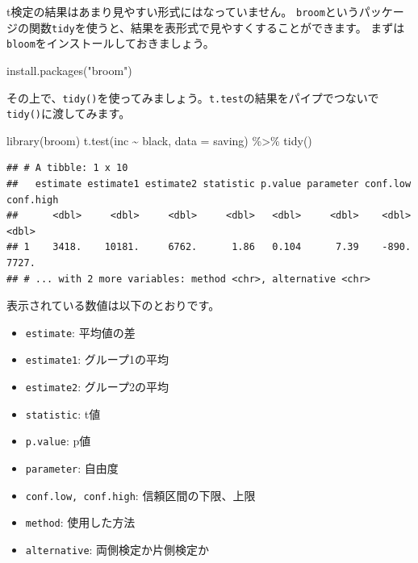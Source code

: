 \documentclass[
]{book}
\newenvironment{Shaded}{\begin{snugshade}}{\end{snugshade}}
\newcommand{\AttributeTok}[1]{\textcolor[rgb]{0.77,0.63,0.00}{#1}}
\newcommand{\FunctionTok}[1]{\textcolor[rgb]{0.00,0.00,0.00}{#1}}
\newcommand{\NormalTok}[1]{#1}
\newcommand{\SpecialCharTok}[1]{\textcolor[rgb]{0.00,0.00,0.00}{#1}}
\newcommand{\StringTok}[1]{\textcolor[rgb]{0.31,0.60,0.02}{#1}}
\providecommand{\tightlist}{%
  \setlength{\itemsep}{0pt}\setlength{\parskip}{0pt}}
\begin{document}
t検定の結果はあまり見やすい形式にはなっていません。
\texttt{broom}というパッケージの関数\texttt{tidy}を使うと、結果を表形式で見やすくすることができます。
まずは\texttt{bloom}をインストールしておきましょう。

\begin{Shaded}
\begin{Highlighting}[]
\FunctionTok{install.packages}\NormalTok{(}\StringTok{"broom"}\NormalTok{)}
\end{Highlighting}
\end{Shaded}

その上で、\texttt{tidy()}を使ってみましょう。\texttt{t.test}の結果をパイプでつないで\texttt{tidy()}に渡してみます。

\begin{Shaded}
\begin{Highlighting}[]
\FunctionTok{library}\NormalTok{(broom)}
\FunctionTok{t.test}\NormalTok{(inc }\SpecialCharTok{\textasciitilde{}}\NormalTok{ black, }\AttributeTok{data =}\NormalTok{ saving) }\SpecialCharTok{\%\textgreater{}\%}
  \FunctionTok{tidy}\NormalTok{()}
\end{Highlighting}
\end{Shaded}

\begin{verbatim}
## # A tibble: 1 x 10
##   estimate estimate1 estimate2 statistic p.value parameter conf.low conf.high
##      <dbl>     <dbl>     <dbl>     <dbl>   <dbl>     <dbl>    <dbl>     <dbl>
## 1    3418.    10181.     6762.      1.86   0.104      7.39    -890.     7727.
## # ... with 2 more variables: method <chr>, alternative <chr>
\end{verbatim}

表示されている数値は以下のとおりです。

\begin{itemize}
\tightlist
\item
  \texttt{estimate}: 平均値の差
\item
  \texttt{estimate1}: グループ1の平均
\item
  \texttt{estimate2}: グループ2の平均
\item
  \texttt{statistic}: t値
\item
  \texttt{p.value}: p値
\item
  \texttt{parameter}: 自由度
\item
  \texttt{conf.low,\ conf.high}: 信頼区間の下限、上限
\item
  \texttt{method}: 使用した方法
\item
  \texttt{alternative}: 両側検定か片側検定か
\end{itemize}
\end{document}
